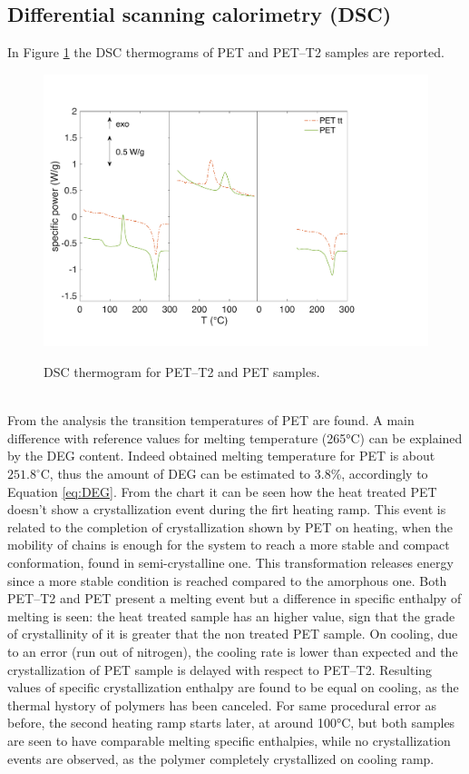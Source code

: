 \documentclass[a4paper, 11pt]{article}
\begin{document}
\newpage

\subsection{Differential scanning calorimetry (DSC)}

In Figure \ref{fig:dscPET} the DSC thermograms of PET and PET–T2 samples are reported. 
\begin{figure}[htp]
\centering
{\includegraphics[scale=0.45]{dscPET}} 
\captionsetup{justification=centering}
\caption{DSC thermogram for PET–T2 and PET samples.}
\label{fig:dscPET}
\end{figure}\\
From the analysis the transition temperatures of PET are found. A main difference with reference values for melting temperature (265°C) can be explained by the DEG content. Indeed obtained melting temperature for PET is about $251.8^\circ$C, thus the amount of DEG can be estimated to 3.8\%, accordingly to Equation \ref{eq:DEG}. 
From the chart it can be seen how the heat treated PET doesn't show a crystallization event during the firt heating ramp. This event is related to the completion of crystallization shown by PET on heating, when the mobility of chains is enough for the system to reach a more stable and compact conformation, found in semi-crystalline one. This transformation releases energy since a more stable condition is reached compared to the amorphous one. Both PET–T2 and PET present a melting event but a difference in specific enthalpy of melting is seen: the heat treated sample has an higher value, sign that the grade of crystallinity of it is greater that the non treated PET sample. On cooling, due to an error (run out of nitrogen), the cooling rate is lower than expected and the crystallization of PET sample is delayed with respect to PET–T2. Resulting values of specific crystallization enthalpy are found to be equal on cooling, as the thermal hystory of polymers has been canceled. For same procedural error as before, the second heating ramp starts later, at around 100°C, but both samples are seen to have comparable melting specific enthalpies, while no crystallization events are observed, as the polymer completely crystallized on cooling ramp. 
\newpage
\end{document}
